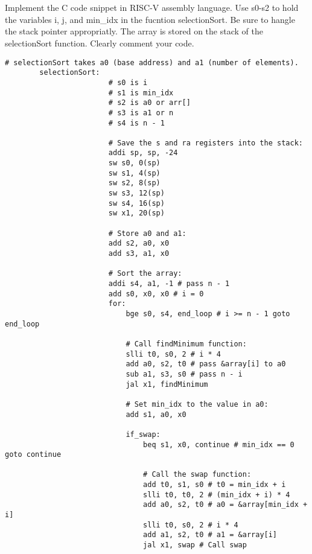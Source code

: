 \documentclass[12pt]{article}
\begin{document}
    \section{}
    \begin{flushleft}
        Implement the C code snippet in RISC-V assembly language. Use s0-s2 to hold the variables
        i, j, and min_idx in the fucntion selectionSort. Be sure to hangle the stack pointer
        appropriatly. The array is stored on the stack of the selectionSort function. Clearly 
        comment your code.
    \end{flushleft}
    \begin{lstlisting}[language=RISCV]
# selectionSort takes a0 (base address) and a1 (number of elements).
        selectionSort:
                        # s0 is i
                        # s1 is min_idx
                        # s2 is a0 or arr[]
                        # s3 is a1 or n
                        # s4 is n - 1

                        # Save the s and ra registers into the stack:
                        addi sp, sp, -24
                        sw s0, 0(sp) 
                        sw s1, 4(sp)
                        sw s2, 8(sp)
                        sw s3, 12(sp)
                        sw s4, 16(sp)
                        sw x1, 20(sp)

                        # Store a0 and a1:
                        add s2, a0, x0
                        add s3, a1, x0
            
                        # Sort the array:
                        addi s4, a1, -1 # pass n - 1 
                        add s0, x0, x0 # i = 0
                        for:
                            bge s0, s4, end_loop # i >= n - 1 goto end_loop

                            # Call findMinimum function:
                            slli t0, s0, 2 # i * 4  
                            add a0, s2, t0 # pass &array[i] to a0
                            sub a1, s3, s0 # pass n - i 
                            jal x1, findMinimum

                            # Set min_idx to the value in a0:
                            add s1, a0, x0 

                            if_swap:
                                beq s1, x0, continue # min_idx == 0 goto continue

                                # Call the swap function:
                                add t0, s1, s0 # t0 = min_idx + i
                                slli t0, t0, 2 # (min_idx + i) * 4 
                                add a0, s2, t0 # a0 = &array[min_idx + i]
                                slli t0, s0, 2 # i * 4
                                add a1, s2, t0 # a1 = &array[i]
                                jal x1, swap # Call swap


\end{lstlisting}
\end{document}
